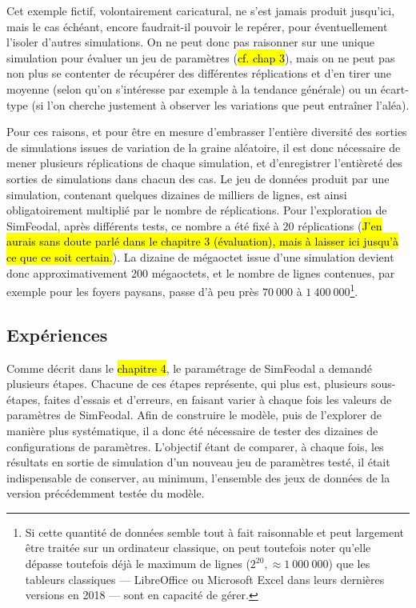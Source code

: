 	Cet exemple fictif, volontairement caricatural, ne s'est jamais produit jusqu'ici, mais le cas échéant, encore faudrait-il pouvoir le repérer, pour éventuellement l'isoler d'autres simulations.
	On ne peut donc pas raisonner sur une unique simulation pour évaluer un jeu de paramètres (\hl{cf. chap 3}), mais on ne peut pas non plus se contenter de récupérer des différentes réplications et d'en tirer une moyenne (selon qu'on s'intéresse par exemple à la tendance générale) ou un écart-type (si l'on cherche justement à observer les variations que peut entraîner l'aléa).

	Pour ces raisons, et pour être en mesure d'embrasser l'entière diversité des sorties de simulations issues de variation de la graine aléatoire, il est donc nécessaire de mener plusieurs réplications de chaque simulation, et d'enregistrer l'entièreté des sorties de simulations dans chacun des cas.
	Le jeu de données produit par une simulation, contenant quelques dizaines de milliers de lignes, est ainsi obligatoirement multiplié par le nombre de réplications.
	Pour l'exploration de SimFeodal, après différents tests, ce nombre a été fixé à $20$ réplications (\hl{J'en aurais sans doute parlé dans le chapitre 3 (évaluation), mais à laisser ici jusqu'à ce que ce soit certain.}).
	La dizaine de mégaoctet issue d'une simulation devient donc approximativement 200 mégaoctets, et le nombre de lignes contenues, par exemple pour les foyers paysans, passe d'à peu près $70~000$ à $1~400~000$\footnote{
	Si cette quantité de données semble tout à fait raisonnable et peut largement être traitée sur un ordinateur classique, on peut toutefois noter qu'elle dépasse toutefois déjà le maximum de lignes ($2^{20}, \approx 1~000~000$) que les tableurs classiques ---
	LibreOffice ou Microsoft Excel dans leurs dernières versions en 2018
	--- sont en capacité de gérer.
	}.

	\subsection{Expériences}

	Comme décrit dans le \hl{chapitre 4}, le paramétrage de SimFeodal a demandé plusieurs étapes.
	Chacune de ces étapes représente, qui plus est, plusieurs sous-étapes, faites d'essais et d'erreurs, en faisant varier à chaque fois les valeurs de paramètres de SimFeodal.
	Afin de construire le modèle, puis de l'explorer de manière plus systématique, il a donc été nécessaire de tester des dizaines de configurations de paramètres.
	L'objectif étant de comparer, à chaque fois, les résultats en sortie de simulation d'un nouveau jeu de paramètres testé, il était indispensable de conserver, au minimum, l'ensemble des jeux de données de la version précédemment testée du modèle.

